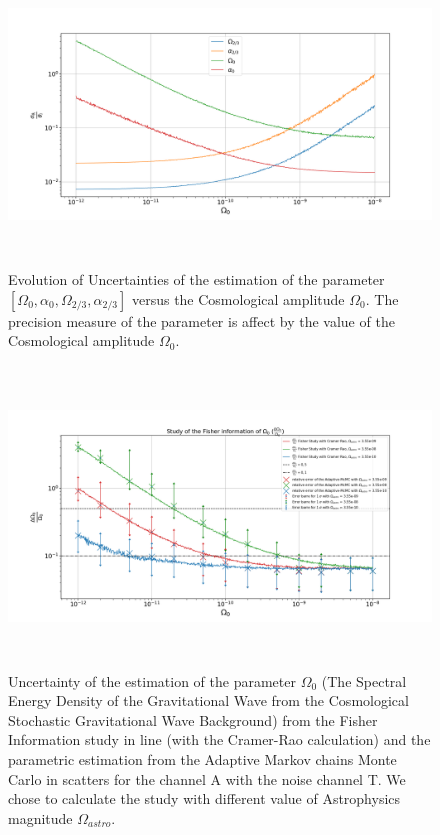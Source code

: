 \documentclass[a4paper,12pt]{article}
\begin{document}
\begin{figure}[H]
    \centering
    \includegraphics[height= 8cm]{FisherAET/Fisherii.png}
    \caption{Evolution of Uncertainties of the estimation of the parameter $[\Omega_0, \alpha_0, \Omega_{2/3}, \alpha_{2/3}]$ versus the Cosmological amplitude $\Omega_0$. The precision measure of the parameter is affect by the value of the Cosmological amplitude $\Omega_0$.}
    \label{fig:FisheriiAE}
\end{figure}

\begin{figure}[H]
    \centering
    \includegraphics[height= 8cm]{FisherAET/Uncertanity2.png}
    \caption{Uncertainty of the estimation of the parameter $\Omega_0$ (The Spectral Energy Density of the Gravitational Wave from the Cosmological Stochastic Gravitational Wave Background) from the Fisher Information study in line (with the Cramer-Rao calculation) and the parametric estimation from the Adaptive Markov chains Monte Carlo in scatters for the channel A with the noise channel T. We chose to calculate the study with different value of Astrophysics magnitude $\Omega_{astro}$.   }
    \label{fig:Fisher2}
\end{figure}
\end{document}
